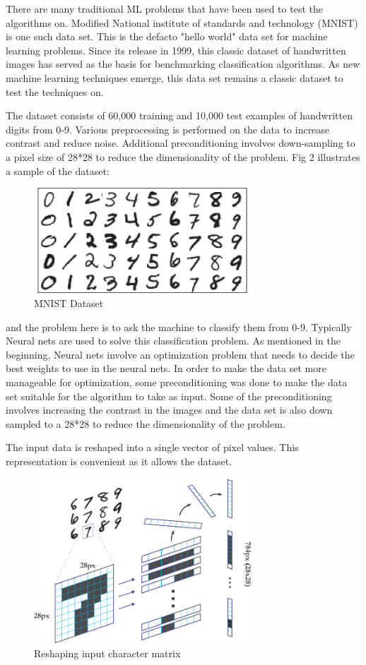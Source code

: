 \documentclass[10pt,twocolumn]{article}
\begin{document}
There are many traditional ML problems that have been used to test the algorithms on. Modified National institute of standards and technology (MNIST) is one such data set. This is the defacto "hello world" data set for machine learning problems. Since its release in 1999, this classic dataset of handwritten images has served as the basis for benchmarking classification algorithms. As new machine learning techniques emerge, this data set remains a classic dataset to test the techniques on. 

The dataset consists of 60,000 training and 10,000 test examples of handwritten digits from 0-9. Various preprocessing is performed on the data to increase contrast and reduce noise. Additional  preconditioning involves down-sampling to a pixel size of 28*28 to reduce the dimensionality of the problem. Fig 2 illustrates a sample of the dataset:

\begin{figure}
\includegraphics[width=3.2in]{./mnist.png}
\caption{MNIST Dataset}
\end{figure}

and the problem here is to ask the machine to classify them from 0-9. Typically Neural nets are used to solve this classification problem. As mentioned in the beginning, Neural nets involve an optimization problem that needs to decide the best weights to use in the neural nets. In order to make the data set more manageable for optimization, some preconditioning was done to make the data set suitable for the algorithm to take as input. Some of the preconditioning involves increasing the contrast in the images and  the data set is also down sampled to a 28*28 to reduce the dimensionality of the problem.

The input data is reshaped into a single vector of pixel values. This representation is convenient as it allows the dataset.

\begin{figure}
\includegraphics[width=3.2in]{./mnist-reshape.png}
\caption{Reshaping input character matrix}
\end{figure}
\end{document}
